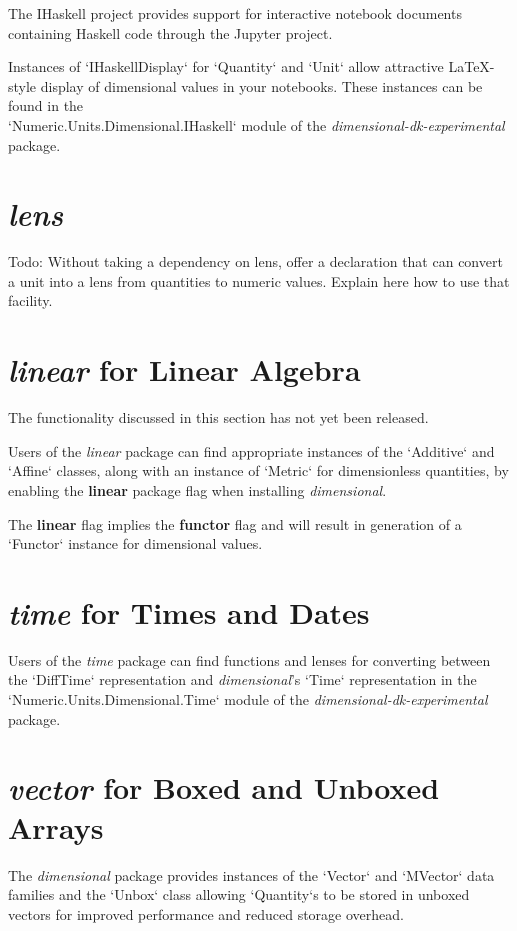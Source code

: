 \documentclass[11pt]{report}
\newcommand{\packagename}[1]{\textit{#1}}
\newcommand{\thispackage}{\packagename{dimensional}}
\newcommand{\experimentalpackage}{\packagename{dimensional-dk-experimental}}
\newcommand{\flag}[1]{\textbf{#1}}
\newcommand{\prerelease}{\begin{framed}
The functionality discussed in this section has not yet been released.
\end{framed}}
\begin{document}
The IHaskell project provides support for interactive notebook documents containing
Haskell code through the Jupyter project.

Instances of `IHaskellDisplay` for `Quantity` and `Unit`
allow attractive \LaTeX{}-style display of dimensional values in your notebooks. These
instances can be found in the \\
`Numeric.Units.Dimensional.IHaskell` module of the \experimentalpackage{}
package.

\section{\packagename{lens}}

Todo: Without taking a dependency on lens, offer a declaration that can convert a unit into a lens from quantities to numeric values.
Explain here how to use that facility.

\section{\packagename{linear} for Linear Algebra}

\prerelease{}

Users of the \packagename{linear} package can find appropriate instances of
the `Additive` and `Affine` classes, along with an
instance of `Metric` for dimensionless quantities, by enabling the \flag{linear}
package flag when installing \thispackage{}.

The \flag{linear} flag implies the \flag{functor} flag and will result in generation of a `Functor`
instance for dimensional values.

\section{\packagename{time} for Times and Dates}

Users of the \packagename{time} package can find functions and lenses for converting
between the `DiffTime` representation and \thispackage{}'s `Time` representation in the
`Numeric.Units.Dimensional.Time` module of the \experimentalpackage{} package.

\section{\packagename{vector} for Boxed and Unboxed Arrays}

The \thispackage{} package provides instances of the `Vector` and `MVector` data families and the `Unbox` class
allowing `Quantity`s to be stored in unboxed vectors for improved performance and reduced storage overhead.
\end{document}
